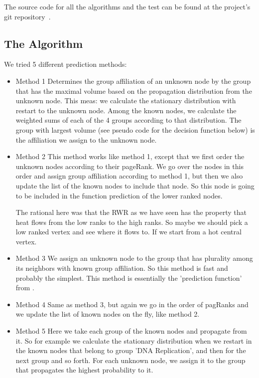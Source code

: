 The source code for all the algorithms and the test can be found at
the project's git repository~\cite{project_git}.

\subsection*{The Algorithm}

We tried 5 different prediction methods:

\begin{itemize}
\item{Method 1} Determines the group affiliation of an unknown node
by the group that has the maximal volume based on the propagation
distribution from the unknown node. This meas: we calculate the
stationary distribution with restart to the unknown node. Among the
known nodes, we calculate the weighted sums of each of the 4 groups
according to that distribution. The group with largest volume (see
pseudo code for the decision function below) is the affiliation we
assign to the unknown node.


\item{Method 2} This method works like method 1, except that we first order the
unknown nodes according to their pageRank. We go over the
nodes in this order and assign group affiliation according to method 1, but then
we also update the list of the known nodes to include that node. So this node is
going to be included in the function prediction of the lower ranked nodes.

The rational here was that the RWR as we have seen has the property
that heat flows from the low ranks to the high ranks. So maybe we
should pick a low ranked vertex and see where it flows to.
If we start from a hot central vertex.

\item{Method 3} We assign an unknown node to the group that has plurality among
its neighbors with known group affiliation. So this method is fast and
probably the simplest. This method is essentially the 'prediction
function' from \cite{schwikowski2000network}.

\item{Method 4} Same as method 3, but again we go in the order of pagRanks and
we update the list of known nodes on the fly, like method 2.

\item{Method 5} Here we take each group of the known nodes and propagate from
it. So for example we calculate the stationary distribution when we restart in
the known nodes that belong to group 'DNA Replication', and then for the next
group and so forth. For each unknown node, we assign it to the group that
propagates the highest probability to it.


\end{itemize}
